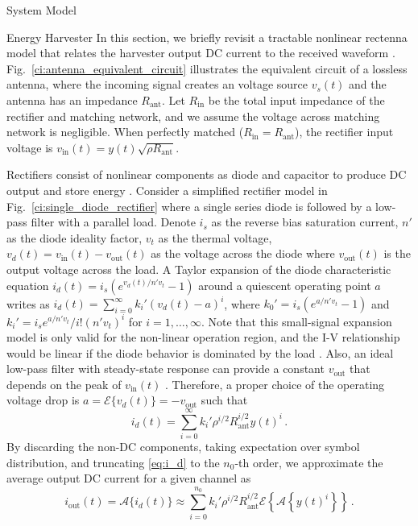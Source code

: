 \documentclass[journal]{IEEEtran}
\begin{document}
\begin{section}{System Model}
\begin{subsection}{Energy Harvester}
			In this section, we briefly revisit a tractable nonlinear rectenna model that relates the harvester output DC current to the received waveform \cite{Clerckx2016a,Clerckx2018b}. Fig.~\ref{ci:antenna_equivalent_circuit} illustrates the equivalent circuit of a lossless antenna, where the incoming signal creates an voltage source $v_s(t)$ and the antenna has an impedance $R_{\text{ant}}$. Let $R_{\text{in}}$ be the total input impedance of the rectifier and matching network, and we assume the voltage across matching network is negligible. When perfectly matched ($R_{\text{in}}=R_{\text{ant}}$), the rectifier input voltage is $v_{\text{in}}(t)=y(t)\sqrt{\rho R_{\text{ant}}}$.

			Rectifiers consist of nonlinear components as diode and capacitor to produce DC output and store energy \cite{Pinuela2013}. Consider a simplified rectifier model in Fig.~\ref{ci:single_diode_rectifier} where a single series diode is followed by a low-pass filter with a parallel load. Denote $i_s$ as the reverse bias saturation current, $n'$ as the diode ideality factor, $v_t$ as the thermal voltage, $v_d(t)=v_{\text{in}}(t)-v_{\text{out}}(t)$ as the voltage across the diode where $v_{\text{out}}(t)$ is the output voltage across the load. A Taylor expansion of the diode characteristic equation $i_d(t)=i_s(e^{v_d(t)/n' v_t}-1)$ around a quiescent operating point $a$ writes as $i_d(t)=\sum_{i=0}^{\infty}k_i'(v_d(t)-a)^i$, where $k_0'=i_s(e^{a/n' v_t}-1)$ and $k_i'=i_se^{a/n'v_t}/i!(n'v_t)^i$ for $i=1,\dots,\infty$. Note that this small-signal expansion model is only valid for the non-linear operation region, and the I-V relationship would be linear if the diode behavior is dominated by the load \cite{Clerckx2016a}. Also, an ideal low-pass filter with steady-state response can provide a constant $v_{\text{out}}$ that depends on the peak of $v_{\text{in}}(t)$ \cite{Curty2005}. Therefore, a proper choice of the operating voltage drop is $a=\mathcal{E}\{v_d(t)\}=-v_{\text{out}}$ such that
			\begin{equation}\label{eq:i_d}
				i_d(t)=\sum_{i=0}^{\infty}k_i'\rho^{i/2}R_{\text{ant}}^{i/2}y(t)^i\,.
			\end{equation}
			By discarding the non-DC components, taking expectation over symbol distribution, and truncating \ref{eq:i_d} to the $n_0$-th order, we approximate the average output DC current for a given channel as
			\begin{equation}\label{eq:i_out}
				i_{\text{out}}(t)=\mathcal{A}\{i_d(t)\}\approx\sum_{i=0}^{n_0}{k_i'}{\rho^{i/2}}{R_{\text{ant}}^{i/2}}\mathcal{E}\left\{{\mathcal{A}\left\{y(t)^i\right\}}\right\}\,.

\end{equation}
\end{subsection}
\end{section}
\end{document}
